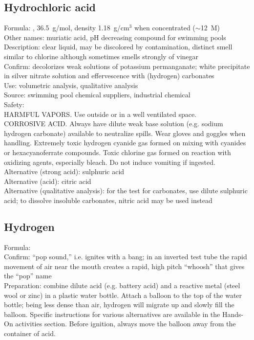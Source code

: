 \subsection{Hydrochloric acid}
\label{sec:hydroacid}
Formula: , 
36.5~g/mol, 
density 1.18~g/cm$^{3}$ when concentrated ($\sim$12~M)\\
Other names: muriatic acid, 
pH decreasing compound for swimming pools\\
Description: clear liquid, 
may be discolored by contamination, 
distinct smell similar to chlorine 
although sometimes smells strongly of vinegar\\
Confirm: decolorizes weak solutions of potassium permanganate; 
white precipitate in silver nitrate solution 
and effervescence with (hydrogen) carbonates\\
Use: volumetric analysis, 
qualitative analysis\\
Source: swimming pool chemical suppliers, industrial chemical\\ 
Safety: \\HARMFUL VAPORS. 
Use outside or in a well ventilated space. 
\\CORROSIVE ACID. 
Always have dilute weak base solution (e.g. 
sodium hydrogen carbonate) available to neutralize spills. 
Wear gloves and goggles when handling. 
Extremely toxic hydrogen cyanide gas formed 
on mixing with cyanides or hexacyanoferrate compounds. 
Toxic chlorine gas formed on reaction with oxidizing agents, 
especially bleach. 
Do not induce vomiting if ingested.\\
Alternative (strong acid): sulphuric acid\\
Alternative (acid): citric acid\\
Alternative (qualitative analysis): for the test for carbonates, 
use dilute sulphuric acid; 
to dissolve insoluble carbonates, 
nitric acid may be used instead
\subsection{Hydrogen}
Formula: \\
Confirm: ``pop sound,'' i.e. 
ignites with a bang; 
in an inverted test tube the rapid movement of air 
near the mouth creates a rapid, 
high pitch ``whoosh'' that gives the ``pop'' name\\
Preparation: combine dilute acid (e.g. 
battery acid) and a reactive metal (steel wool or zinc) 
in a plastic water bottle. 
Attach a balloon to the top of the water bottle; 
being less dense than air, 
hydrogen will migrate up and slowly fill the balloon. 
Specific instructions for various alternatives are available 
in the Hands-On activities section. 
Before ignition, 
always move the balloon away from the container of acid.


